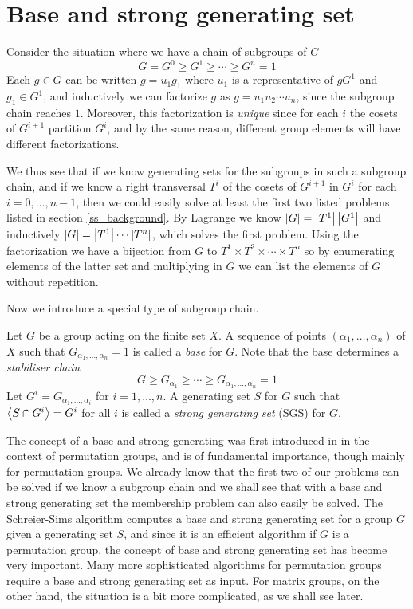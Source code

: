 \section{Base and strong generating set}
Consider the situation where we have a chain of subgroups of $G$
\begin{equation}
G = G^0 \geq G^1 \geq \dotsb \geq G^n = 1
\end{equation}
Each $g \in G$ can be written $g = u_1 g_1$ where $u_1$ is a
representative of $gG^1$ and $g_1 \in G^1$, and inductively we can
factorize $g$ as $g = u_1 u_2 \dotsm u_n$, since the subgroup chain
reaches $1$. Moreover, this factorization is \emph{unique} since for each $i$ the cosets of $G^{i + 1}$ partition $G^i$, and by the same reason, different group elements will have different factorizations.

We thus see that if we know generating sets for the subgroups in such
a subgroup chain, and if we know a right transversal $T^i$ of the cosets of
$G^{i + 1}$ in $G^i$ for each $i = 0, \dotsc, n - 1$, then we could easily
solve at least the first two listed problems listed in section
\ref{ss_background}. By Lagrange we know $\left\lvert G \right\rvert = \left\lvert T^1 \right\rvert
\left\lvert G^1 \right\rvert$ and inductively $\left\lvert G \right\rvert = \left\lvert T^1 \right\rvert \dotsm \left\lvert T^n \right\rvert$,
which solves the first problem. Using the factorization we have a
bijection from $G$ to $T^1 \times T^2 \times \dotsb \times T^n$ so by
enumerating elements of the latter set and multiplying in $G$ we can list the elements of $G$ without repetition.

Now we introduce a special type of subgroup chain.
\begin{deff}
  Let $G$ be a group acting on the finite set $X$. A sequence of points
  $(\alpha_1, \dotsc, \alpha_n)$ of $X$ such that
  $G_{\alpha_1, \dotsc, \alpha_n} = 1$ is called a \emph{base} for
  $G$. Note that the base determines a \emph{stabiliser chain}
\begin{equation}
G \geq G_{\alpha_1} \geq \dotsb \geq G_{\alpha_1, \dotsc, \alpha_n} = 1
\end{equation}
Let $G^i = G_{\alpha_1, \dotsc, \alpha_i}$ for $i = 1, \dotsc, n$. A generating set $S$ for $G$ such that $\left\langle S \cap G^i \right\rangle = G^i$ for all $i$ is called a \emph{strong generating set} (SGS) for $G$.
\end{deff}

The concept of a base and strong generating was first introduced in
\cite{sims70} in the context of permutation groups, and is of
fundamental importance, though mainly for permutation groups. We
already know that the first two of our problems can be solved if we
know a subgroup chain and we shall see that with a base and strong
generating set the membership problem can also easily be solved. The
Schreier-Sims algorithm computes a base and strong generating set for
a group $G$ given a generating set $S$, and since it is an efficient
algorithm if $G$ is a permutation group, the concept of base and
strong generating set has become very important. Many more
sophisticated algorithms for permutation groups require a base and
strong generating set as input. For matrix groups, on the other hand,
the situation is a bit more complicated, as we shall see later.

